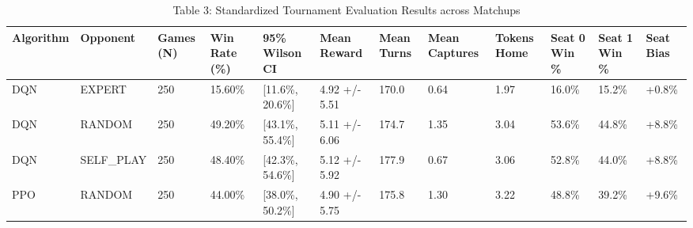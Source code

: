 \begin{table}
\caption{Table 3: Standardized Tournament Evaluation Results across Matchups}
\label{tab:table_evaluation_results}
\begin{tabular}{llllllllllll}
\toprule
Algorithm & Opponent & Games (N) & Win Rate (\%) & 95\% Wilson CI & Mean Reward & Mean Turns & Mean Captures & Tokens Home & Seat 0 Win \% & Seat 1 Win \% & Seat Bias \\
\midrule
DQN & EXPERT & 250 & 15.60\% & [11.6\%, 20.6\%] & 4.92 +/- 5.51 & 170.0 & 0.64 & 1.97 & 16.0\% & 15.2\% & +0.8\% \\
DQN & RANDOM & 250 & 49.20\% & [43.1\%, 55.4\%] & 5.11 +/- 6.06 & 174.7 & 1.35 & 3.04 & 53.6\% & 44.8\% & +8.8\% \\
DQN & SELF\_PLAY & 250 & 48.40\% & [42.3\%, 54.6\%] & 5.12 +/- 5.92 & 177.9 & 0.67 & 3.06 & 52.8\% & 44.0\% & +8.8\% \\
PPO & RANDOM & 250 & 44.00\% & [38.0\%, 50.2\%] & 4.90 +/- 5.75 & 175.8 & 1.30 & 3.22 & 48.8\% & 39.2\% & +9.6\% \\
\bottomrule
\end{tabular}
\end{table}
